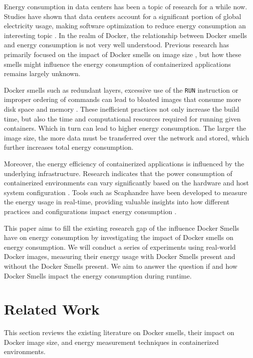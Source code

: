 \documentclass[conference]{IEEEtran}
\begin{document}
Energy consumption in data centers has been a topic of research for a while now. Studies have shown that data centers account for a significant portion of global electricity usage, making software optimization to reduce energy consumption an interesting topic \cite{koomey2011growth}. In the realm of Docker, the relationship between Docker smells and energy consumption is not very well understood. Previous research has primarily focused on the impact of Docker smells on image size \cite{durieuxEmpericalStudy}, but how these smells might influence the energy consumption of containerized applications remains largely unknown.

Docker smells such as redundant layers, excessive use of the \texttt{RUN} instruction or improper ordering of commands can lead to bloated images that consume more disk space and memory \cite{cito2017empirical}. These inefficient practices not only increase the build time, but also the time and computational resources required for running given containers. Which in turn can lead to higher energy consumption. The larger the image size, the more data must be transferred over the network and stored, which further increases total energy consumption.

Moreover, the energy efficiency of containerized applications is influenced by the underlying infrastructure. Research indicates that the power consumption of containerized environments can vary significantly based on the hardware and host system configuration \cite{morabito2017power}. Tools such as Scaphandre\cite{scaphandre} have been developed to measure the energy usage in real-time, providing valuable insights into how different practices and configurations impact energy consumption \cite{mehulMonitoringEnergy}.

This paper aims to fill the existing research gap of the influence Docker Smells have on energy consumption by investigating the impact of Docker smells on energy consumption. We will conduct a series of experiments using real-world Docker images, measuring their energy usage with Docker Smells present and without the Docker Smells present. We aim to answer the question if and how Docker Smells impact the energy consumption during runtime.


\section{Related Work}

This section reviews the existing literature on Docker smells, their impact on Docker image size, and energy measurement techniques in containerized environments.
\end{document}
